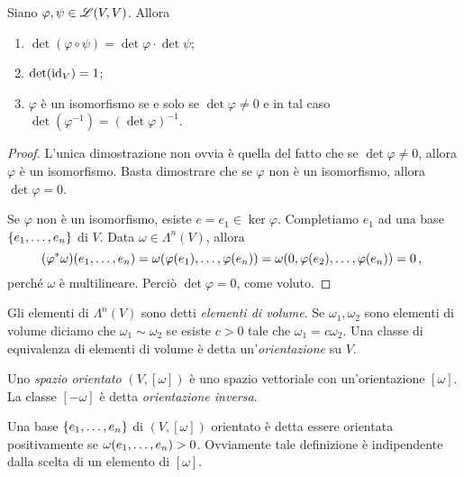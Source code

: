 \begin{proposition}
	Siano $\varphi,\psi \in\Lin(V,V)$. Allora
	\begin{enumerate}
		\item $\det(\varphi\circ\psi) = \det \varphi \cdot \det \psi$;
		\item $\det (\id_V) = 1$;
		\item $\varphi$ è un isomorfismo se e solo se $\det\varphi\not=0$ e in tal caso $\det(\varphi^{-1}) = (\det \varphi)^{-1}$.
	\end{enumerate}
\end{proposition}
\begin{proof}
	L'unica dimostrazione non ovvia è quella del fatto che se $\det\varphi\not=0$, allora $\varphi$ è un isomorfismo.
	Basta dimostrare che se $\varphi$ non è un isomorfismo, allora $\det\varphi = 0$.
	
	Se $\varphi$ non è un isomorfismo, esiste $e=e_1\in\ker\varphi$. Completiamo $e_1$ ad una base $\{\seqb en,\}$ di $V$. Data $\omega\in\Lambda^n(V)$, allora
	\begin{equation*}
		(\varphi^*\omega)(\seqb en,) = \omega(\varphi(e_1),\ldots,\varphi(e_n)) = \omega(0,\varphi(e_2),\ldots,\varphi(e_n)) = 0 \virgola
	\end{equation*}
	perché $\omega$ è multilineare. Perciò $\det\varphi = 0$, come voluto.
\end{proof}

\begin{definition}  
	Gli elementi di $\Lambda^n(V)$ sono detti \emph{elementi di volume}. Se $\omega_1,\omega_2$ sono elementi di volume diciamo che $\omega_1\sim \omega_2$ se esiste $c>0$ tale che $\omega_1 = c\omega_2$. Una classe di equivalenza di elementi di volume è detta un'\emph{orientazione} su $V$.
	
	Uno \emph{spazio orientato} $(V, [\omega])$ è uno spazio vettoriale con un'orientazione $[\omega]$. La classe $[-\omega]$ è detta \emph{orientazione inversa}.
	
	Una base $\{\seqb en,\}$ di $(V,[\omega])$ orientato è detta essere orientata positivamente se $\omega(\seqb en,)>0$. Ovviamente tale definizione è indipendente dalla scelta di un elemento di $[\omega]$.
\end{definition}

